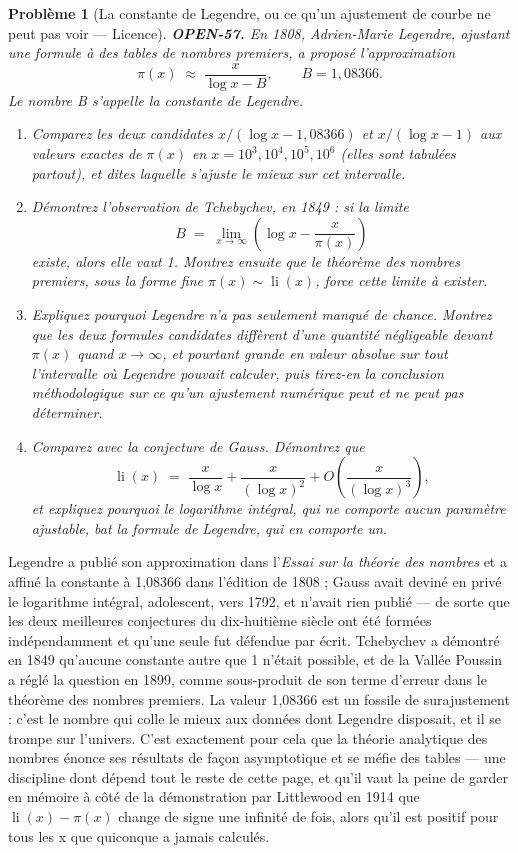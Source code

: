 \documentclass[11pt]{article}
\newtheorem{problem}{Problème}
\begin{document}
\begin{problem}[{La constante de Legendre, ou ce qu'un ajustement de courbe ne peut pas voir --- Licence}]
\textbf{OPEN-57.} En 1808, Adrien-Marie Legendre, ajustant une formule à des tables de
nombres premiers, a proposé l'approximation
\[ \pi(x) \;\approx\; \frac{x}{\log x - B}, \qquad B = 1{,}08366 . \]
Le nombre B s'appelle la constante de Legendre.
\begin{enumerate}
\item[(a)] Comparez les deux candidates $ x/(\log x - 1{,}08366) $ et $ x/(\log x - 1) $ aux
valeurs exactes de $ \pi(x) $ en $ x = 10^3, 10^4, 10^5, 10^6 $ (elles sont tabulées
partout), et dites laquelle s'ajuste le mieux sur cet intervalle.
\item[(b)] Démontrez l'observation de Tchebychev, en 1849 : si la limite
\[ B \;=\; \lim_{x \to \infty} \left( \log x - \frac{x}{\pi(x)} \right) \]
existe, alors elle vaut 1. Montrez ensuite que le théorème des nombres premiers, sous la
forme fine $ \pi(x) \sim \operatorname{li}(x) $, force cette limite à exister.
\item[(c)] Expliquez pourquoi Legendre n'a pas seulement manqué de chance. Montrez que les deux
formules candidates diffèrent d'une quantité négligeable devant $ \pi(x) $ quand
$ x \to \infty $, et pourtant grande en valeur absolue sur tout l'intervalle où Legendre
pouvait calculer, puis tirez-en la conclusion méthodologique sur ce qu'un ajustement
numérique peut et ne peut pas déterminer.
\item[(d)] Comparez avec la conjecture de Gauss. Démontrez que
\[ \operatorname{li}(x) \;=\; \frac{x}{\log x} + \frac{x}{(\log x)^2} + O\!\left( \frac{x}{(\log x)^3} \right), \]
et expliquez pourquoi le logarithme intégral, qui ne comporte aucun paramètre ajustable,
bat la formule de Legendre, qui en comporte un.
\end{enumerate}

\end{problem}

\noindent Legendre a publié son approximation dans l'\textit{Essai sur la théorie des
nombres} et a affiné la constante à 1,08366 dans l'édition de 1808 ; Gauss avait deviné
en privé le logarithme intégral, adolescent, vers 1792, et n'avait rien publié --- de sorte
que les deux meilleures conjectures du dix-huitième siècle ont été formées indépendamment
et qu'une seule fut défendue par écrit. Tchebychev a démontré en 1849 qu'aucune constante
autre que 1 n'était possible, et de la Vallée Poussin a réglé la question en 1899, comme
sous-produit de son terme d'erreur dans le théorème des nombres premiers. La valeur
1,08366 est un fossile de surajustement : c'est le nombre qui colle le mieux aux données
dont Legendre disposait, et il se trompe sur l'univers. C'est exactement pour cela que la
théorie analytique des nombres énonce ses résultats de façon asymptotique et se méfie des
tables --- une discipline dont dépend tout le reste de cette page, et qu'il vaut la peine de
garder en mémoire à côté de la démonstration par Littlewood en 1914 que
$ \operatorname{li}(x) - \pi(x) $ change de signe une infinité de fois, alors qu'il est
positif pour tous les x que quiconque a jamais calculés.
\end{document}
